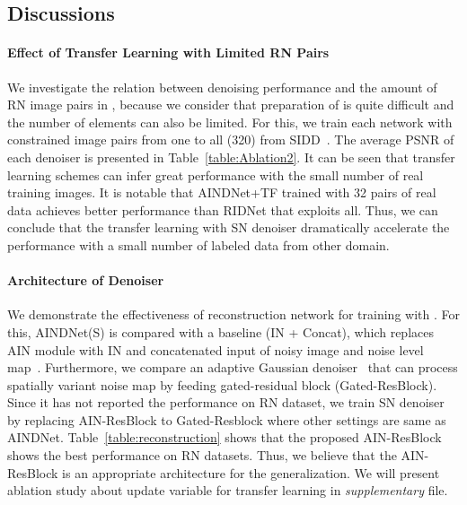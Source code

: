 \documentclass[10pt,twocolumn,letterpaper]{article}
\begin{document}
\subsection{Discussions}
\paragraph{Effect of Transfer Learning with Limited RN Pairs}
We investigate the relation between denoising performance and the amount of RN image pairs in , 
because we consider that preparation of  is quite difficult and the number of elements can also be limited. 
For this, we train each network with constrained image pairs from one to all (320) from SIDD~\cite{abdelhamed2018high}.
The average PSNR of each denoiser is presented in Table~\ref{table:Ablation2}. 
It can be seen that transfer learning schemes can infer great performance with the small number of real training images. 
It is notable that AINDNet+TF trained with 32 pairs of real data achieves better performance than RIDNet that exploits all.
Thus, we can conclude that the transfer learning with SN denoiser dramatically accelerate the performance with a small number of labeled data from other domain.

\paragraph{Architecture of Denoiser}


We demonstrate the effectiveness of reconstruction network for training with .
For this, AINDNet(S) is compared with a baseline (IN + Concat), which replaces AIN module with IN and concatenated input of noisy image and noise level map~\cite{zhang2017learning,zhang2018ffdnet}. 
Furthermore, we compare an adaptive Gaussian denoiser~\cite{kim2019adaptively} that can process spatially variant noise map by feeding gated-residual block (Gated-ResBlock).
Since it has not reported the performance on RN dataset, 
we train SN denoiser by replacing AIN-ResBlock to Gated-Resblock where other settings are same as AINDNet.
Table~\ref{table:reconstruction} shows that the proposed AIN-ResBlock shows the best performance on RN datasets.
Thus, we believe that the AIN-ResBlock is an appropriate architecture for the generalization.
We will present ablation study about update variable for transfer learning in \textit{supplementary} file.
\end{document}
